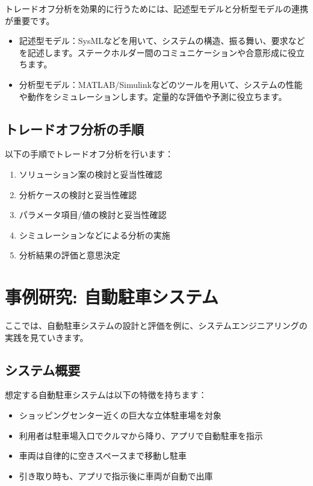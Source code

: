 トレードオフ分析を効果的に行うためには、記述型モデルと分析型モデルの連携が重要です。

\begin{itemize}
    \item 記述型モデル：SysMLなどを用いて、システムの構造、振る舞い、要求などを記述します。ステークホルダー間のコミュニケーションや合意形成に役立ちます。
    \item 分析型モデル：MATLAB/Simulinkなどのツールを用いて、システムの性能や動作をシミュレーションします。定量的な評価や予測に役立ちます。
\end{itemize}

\subsection{トレードオフ分析の手順}

以下の手順でトレードオフ分析を行います：

\begin{enumerate}
    \item ソリューション案の検討と妥当性確認
    \item 分析ケースの検討と妥当性確認
    \item パラメータ項目/値の検討と妥当性確認
    \item シミュレーションなどによる分析の実施
    \item 分析結果の評価と意思決定
\end{enumerate}

\section{事例研究: 自動駐車システム}

ここでは、自動駐車システムの設計と評価を例に、システムエンジニアリングの実践を見ていきます。

\subsection{システム概要}

想定する自動駐車システムは以下の特徴を持ちます：

\begin{itemize}
    \item ショッピングセンター近くの巨大な立体駐車場を対象
    \item 利用者は駐車場入口でクルマから降り、アプリで自動駐車を指示
    \item 車両は自律的に空きスペースまで移動し駐車
    \item 引き取り時も、アプリで指示後に車両が自動で出庫
\end{itemize}

